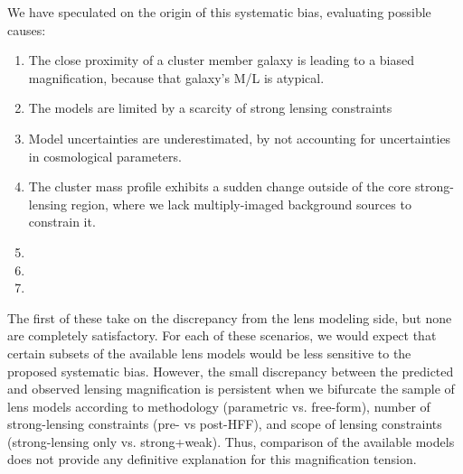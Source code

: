 We have speculated on the origin of this systematic bias,
evaluating  possible causes: 

\begin{enumerate}
\item The close proximity of a cluster member galaxy is leading to a
biased magnification, because that galaxy's M/L is atypical.
\item The models are limited by a scarcity of strong lensing constraints
\item Model uncertainties are underestimated, by not accounting for 
       uncertainties in cosmological parameters.
\item The cluster mass profile exhibits a sudden change outside of the core
strong-lensing region, where we lack multiply-imaged background
sources to constrain it.
\item {}
\item {}
\item {}
\end{enumerate}

\noindent The first  of these take on the discrepancy from 
the lens modeling side, but none are completely satisfactory. For each
of these scenarios, we would expect that certain subsets of the
available lens models would be less sensitive to the proposed
systematic bias.  However, the small discrepancy between the predicted
and observed lensing magnification is persistent when we bifurcate the
sample of lens models according to methodology (parametric
vs. free-form), number of strong-lensing constraints (pre- vs
post-HFF), and scope of lensing constraints (strong-lensing only
vs. strong+weak). Thus, comparison of the available models does not
provide any definitive explanation for this magnification tension.


